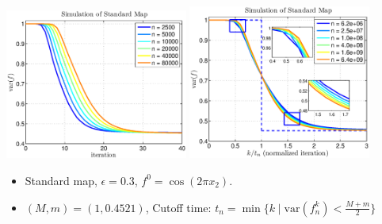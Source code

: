 \documentclass[12pt,t]{beamer}
\begin{document}
\begin{frame}
\begin{center}
\includegraphics[width=0.45\textwidth,trim=1cm 1cm 0cm 0cm]{standardmapcutoff}
\includegraphics[width=0.45\textwidth,trim=1cm 1cm 0cm 0cm]{standardmapcutoffn}
\end{center}
\begin{itemize}
\item Standard map, $\epsilon = 0.3$, $f^0 = \cos(2\pi x_2)$.
\item $(M,m) = (1,0.4521)$, Cutoff time: $t_n =\min \{ k \mid \text{var}(f^k_n)< \frac{M+m}{2}\} $
\end{itemize}
\end{frame}
\end{document}
